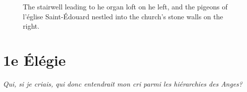 \documentclass[12pt,twoside,maitrise]{dms_ks}
\theoremstyle{definition}
\begin{document}
\begin{figure}[h]
    \centering
    \caption{The stairwell leading to he organ loft on he left, and the pigeons of l'église Saint-Édouard nestled into the church's stone walls on the right.}
    \label{fig:sidebyside}
\end{figure}

\section{1e Élégie}

\epigraph{\textit{Qui, si je criais, qui donc entendrait mon cri parmi les hiérarchies des Anges?}}{}
\end{document}
